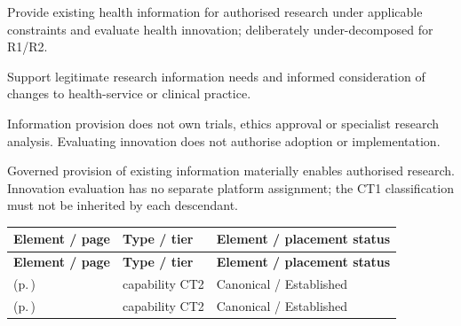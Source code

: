 
Provide existing health information for authorised research under applicable constraints and evaluate health innovation; deliberately under-decomposed for R1/\allowbreak{}R2.



Support legitimate research information needs and informed consideration of changes to health-service or clinical practice.



Information provision does not own trials, ethics approval or specialist research analysis. Evaluating innovation does not authorise adoption or implementation.



Governed provision of existing information materially enables authorised research. Innovation evaluation has no separate platform assignment; the CT1 classification must not be inherited by each descendant.


\begingroup\small\setlength{\TableWidth}{\dimexpr\linewidth-6\tabcolsep-4\arrayrulewidth\relax}
\begin{longtable}{|>{\raggedright\arraybackslash}p{0.52\TableWidth}|>{\raggedright\arraybackslash}p{0.2\TableWidth}|>{\raggedright\arraybackslash}p{0.28\TableWidth}|}
\hline\rowcolor{TableHead}\textbf{Element / page} & \textbf{Type / tier} & \textbf{Element / placement status}\\\hline\endfirsthead
\hline\rowcolor{TableHead}\textbf{Element / page} & \textbf{Type / tier} & \textbf{Element / placement status}\\\hline\endhead
\hline\endfoot
\nameref{cap:bc-research-information-support} (p.\,\pageref{cap:bc-research-information-support}) & capability CT2 & Canonical / Established\\\hline
\nameref{cap:bc-health-innovation} (p.\,\pageref{cap:bc-health-innovation}) & capability CT2 & Canonical / Established\\\hline
\end{longtable}\endgroup

